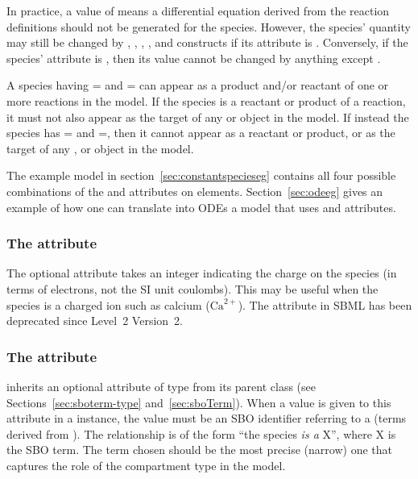 In practice, a  value of  means
a differential equation derived from the reaction definitions
should not be generated for the species.  However, the species'
quantity may still be changed by \AssignmentRule, \RateRule,
\AlgebraicRule, \Event, and \InitialAssignment constructs if its
 attribute is .  Conversely, if the
species'  attribute is , then its value
cannot be changed by anything except \InitialAssignment.

A species having = and
= can appear as a product and/or
reactant of one or more reactions in the model.  If the species is
a reactant or product of a reaction, it must not also appear as
the target of any \AssignmentRule or \RateRule object in the
model.  If instead the species \color{black} has
= and
=, then it cannot appear as a reactant
or product, or as the target of any \AssignmentRule, \RateRule or
\EventAssignment object in the model.


The example model in section~\ref{sec:constantspecieseg} contains
all four possible combinations of the 
and  attributes on  elements.
Section~\ref{sec:odeeg} gives an example of how one can translate
into ODEs a model that uses  and
 attributes.


\subsubsection{The  attribute}
\label{sec:charge}

The optional attribute  takes an integer
indicating the charge on the species (in terms of electrons, not
the SI unit coulombs). This may be useful when the species is a
charged ion such as calcium ($\text{Ca}^{2+}$).  The
 attribute in SBML has been deprecated
since Level~2 Version~2.


\subsubsection{The  attribute}
\label{sec:species-sboterm}

\Species inherits an optional  attribute
of type  from its parent class \SBase (see
Sections~\ref{sec:sboterm-type} and~\ref{sec:sboTerm}).  When a
value is given to this attribute in a \Species instance,
the value must be an SBO identifier referring to a  (\ie terms derived from \sboparticipantphysical).
The relationship is of the form ``the species \emph{is a} X'',
where X is the SBO term.  The term chosen should be the most
precise (narrow) one that captures the role of the compartment
type in the model.


